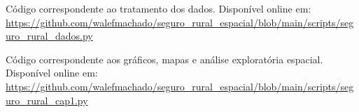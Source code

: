 \documentclass[10pt]{article}
\begin{document}
%

\newpage
\begin{singlespace}
\end{singlespace}
\vspace{0.25cm}
\begin{small}
\linespread{0.86}
\noindent Código correspondente ao tratamento dos dados. Disponível online em:\\ \url{https://github.com/walefmachado/seguro_rural_espacial/blob/main/scripts/seguro_rural_dados.py}

\vspace{0.25cm}

\noindent Código correspondente aos gráficos, mapas e análise exploratória espacial. Disponível online em: \\
\url{https://github.com/walefmachado/seguro_rural_espacial/blob/main/scripts/seguro_rural_cap1.py}
% 
\end{small}
\end{document}
